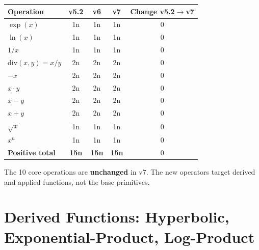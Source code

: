 \documentclass[11pt]{article}
\newcommand{\neu}[1]{\textcolor{neu}{#1}}
\begin{document}
\begin{center}
\begin{tabular}{lcccc}
\toprule
Operation & v5.2 & v6 & v7 & Change v5.2$\to$v7 \\
\midrule
$\exp(x)$        & 1n & 1n & \neu{1n} & 0 \\
$\ln(x)$         & 1n & 1n & \neu{1n} & 0 \\
$1/x$            & 1n & 1n & \neu{1n} & 0 \\
$\mathrm{div}(x,y)=x/y$ & 2n & 2n & \neu{2n} & 0 \\
$-x$             & 2n & 2n & \neu{2n} & 0 \\
$x \cdot y$      & 2n & 2n & \neu{2n} & 0 \\
$x - y$          & 2n & 2n & \neu{2n} & 0 \\
$x + y$          & 2n & 2n & \neu{2n} & 0 \\
$\sqrt{x}$       & 1n & 1n & \neu{1n} & 0 \\
$x^n$            & 1n & 1n & \neu{1n} & 0 \\
\midrule
\textbf{Positive total} & \textbf{15n} & \textbf{15n} & \textbf{15n} & 0 \\
\bottomrule
\end{tabular}
\end{center}

\noindent The 10 core operations are \textbf{unchanged} in v7. The new operators
target derived and applied functions, not the base primitives.

\section{Derived Functions: Hyperbolic, Exponential-Product, Log-Product}
\label{sec:derived}
\end{document}
